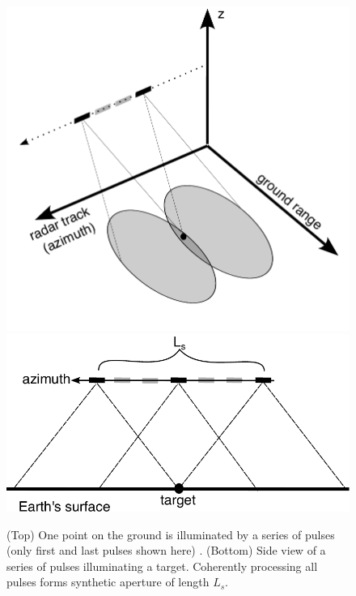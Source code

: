 

\begin{figure}
	\label{fig:ch2-synth-aper}
	\centering
	\includegraphics[width=0.75\linewidth]{figures/chapter2-sar/synth-aper2.pdf}
	\includegraphics[width=0.95\linewidth]{figures/chapter2-sar/sar-synthetic-aperture.pdf}
	\caption[Formation of a synthetic aperture]{
		(Top) One point on the ground is illuminated by a series of pulses (only first and last pulses shown here) .
		(Bottom) Side view of a series of pulses illuminating a target. Coherently processing all pulses forms synthetic aperture of length $L_s$.
	}
\end{figure}


